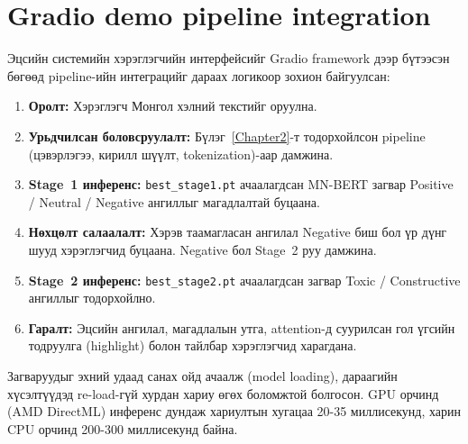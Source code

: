\section{Gradio demo pipeline integration}

Эцсийн системийн хэрэглэгчийн интерфейсийг Gradio framework дээр бүтээсэн
бөгөөд pipeline-ийн интеграцийг дараах логикоор зохион байгуулсан:

\begin{enumerate}
  \item \textbf{Оролт:} Хэрэглэгч Монгол хэлний текстийг оруулна.
  \item \textbf{Урьдчилсан боловсруулалт:} Бүлэг~\ref{Chapter2}-т тодорхойлсон
    pipeline (цэвэрлэгээ, кирилл шүүлт, tokenization)-аар дамжина.
  \item \textbf{Stage~1 инференс:} \texttt{best\_stage1.pt} ачаалагдсан MN-BERT
    загвар Positive / Neutral / Negative ангиллыг магадлалтай буцаана.
  \item \textbf{Нөхцөлт салаалалт:} Хэрэв таамагласан ангилал Negative биш бол
    үр дүнг шууд хэрэглэгчид буцаана. Negative бол Stage~2 руу дамжина.
  \item \textbf{Stage~2 инференс:} \texttt{best\_stage2.pt} ачаалагдсан загвар
    Toxic / Constructive ангиллыг тодорхойлно.
  \item \textbf{Гаралт:} Эцсийн ангилал, магадлалын утга, attention-д суурилсан
    гол үгсийн тодруулга (highlight) болон тайлбар хэрэглэгчид харагдана.
\end{enumerate}

Загваруудыг эхний удаад санах ойд ачаалж (model loading), дараагийн хүсэлтүүдэд
re-load-гүй хурдан хариу өгөх боломжтой болгосон. GPU орчинд (AMD DirectML)
инференс дундаж хариултын хугацаа 20-35 миллисекунд, харин CPU орчинд
200-300 миллисекунд байна.

